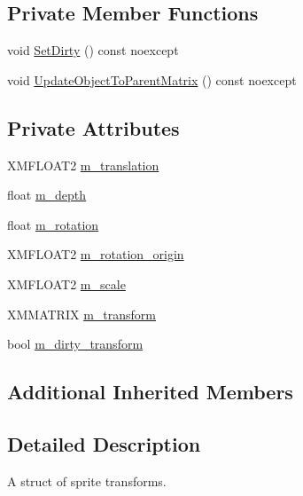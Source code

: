 \subsection*{Private Member Functions}
\begin{DoxyCompactItemize}
\item 
void \hyperlink{structmage_1_1_sprite_transform_ab76e0ca7d8f4e37a8a6f58a7a9face17}{Set\+Dirty} () const noexcept
\item 
void \hyperlink{structmage_1_1_sprite_transform_a92ae51f7dbf034d119625f70aa7fad1c}{Update\+Object\+To\+Parent\+Matrix} () const noexcept
\end{DoxyCompactItemize}
\subsection*{Private Attributes}
\begin{DoxyCompactItemize}
\item 
X\+M\+F\+L\+O\+A\+T2 \hyperlink{structmage_1_1_sprite_transform_a7642907ec8ae9685bb7c56675607045b}{m\+\_\+translation}
\item 
float \hyperlink{structmage_1_1_sprite_transform_a9a61159b9f52e5cc18c0f8cea378714c}{m\+\_\+depth}
\item 
float \hyperlink{structmage_1_1_sprite_transform_a6fcb43d224953ea5f38ef54c4e10e003}{m\+\_\+rotation}
\item 
X\+M\+F\+L\+O\+A\+T2 \hyperlink{structmage_1_1_sprite_transform_ae51ebd0226ef4b569b6a66884823bd18}{m\+\_\+rotation\+\_\+origin}
\item 
X\+M\+F\+L\+O\+A\+T2 \hyperlink{structmage_1_1_sprite_transform_a7532d4d41d02b5fa6f31eeb4fd4fd886}{m\+\_\+scale}
\item 
X\+M\+M\+A\+T\+R\+IX \hyperlink{structmage_1_1_sprite_transform_ad2fec50a82772514da9399ff31703f3d}{m\+\_\+transform}
\item 
bool \hyperlink{structmage_1_1_sprite_transform_a3072ed606f16d14d16cdad46438e9cf3}{m\+\_\+dirty\+\_\+transform}
\end{DoxyCompactItemize}
\subsection*{Additional Inherited Members}


\subsection{Detailed Description}
A struct of sprite transforms. 

